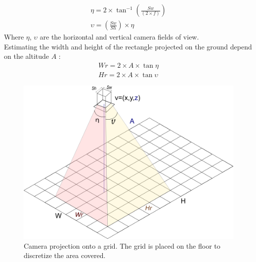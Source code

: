 %
	\begin{equation} \label{eq:etaUpsilon}
 	 \begin{split}
		\eta = 2\times \tan^{-1} (\frac{Sw}{(2\times f)}  ) 
 	   \\
		\upsilon = (\frac{Sw}{Sh} )\times \eta
 	 \end{split}
	\end{equation}
Where $\eta$, $\upsilon$ are the horizontal and vertical camera fields of view.\\
Estimating the width and height of the rectangle projected on the ground depend on the altitude $A$ :
	\begin{equation}\label{eq:WrHr1}
		\begin{split}
    		Wr= 2\times A\times\tan \eta
    	    \\
    	    Hr= 2\times A\times\tan \upsilon
    	 \end{split}
	\end{equation} 
	\begin{figure}[t!]
		\centering
  		\includegraphics[width=\linewidth]{img/CamProject1Bis.png}
  
 	 	\endminipage\hfill\caption{Camera projection onto a grid. The grid is placed on the floor to discretize 	the area covered.}\label{fig:cam_proj}
	\end{figure}

